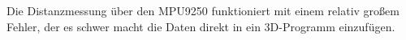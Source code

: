 Die Distanzmessung über den MPU9250 funktioniert 
mit einem relativ großem Fehler, der es schwer macht
die Daten direkt in ein 3D-Programm einzufügen. 